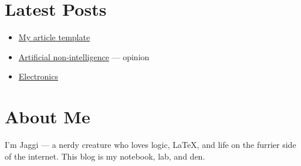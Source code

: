 \documentclass{article}
\begin{document}
\section*{Latest Posts}

\begin{itemize}
  \item \href{posts/article-template.html}{My article template}
  \item
    \href{posts/artificial-non-intelligence/artificial-non-intelligence.html}{Artificial
    non-intelligence} --- opinion
  \item \href{posts/electronics/electronics.html}{Electronics}
\end{itemize}

\section*{About Me}

I'm Jaggi — a nerdy creature who loves logic, LaTeX, and life on the
furrier side of the internet. This blog is my notebook, lab, and den.
\end{document}
